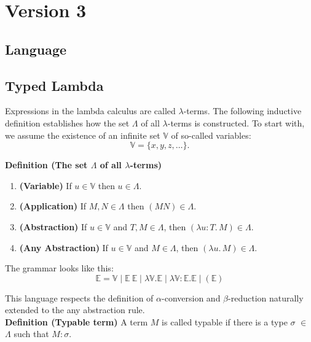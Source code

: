 \section{Version 3}

\subsection{Language}

\subsection{Typed Lambda}

Expressions in the lambda calculus are called \(\lambda\)-terms. The following inductive definition establishes how the set \(\Lambda\) of all \(\lambda\)-terms is constructed. To start with, we assume the existence of an infinite set \(\mathbb{V}\) of so-called variables:
\[
\mathbb{V} = \{ x, y, z, \dots \}.
\]

\medskip

\noindent\textbf{Definition (The set \(\Lambda\) of all \(\lambda\)-terms)}  
\begin{enumerate}
    \item \textbf{(Variable)} If \(u \in \mathbb{V}\) then \(u \in \Lambda\).
    \item \textbf{(Application)} If \(M, N \in \Lambda\) then \((MN) \in \Lambda\).
    \item \textbf{(Abstraction)} If \(u \in \mathbb{V}\) and \(T, M \in \Lambda\), then \((\lambda u : T .\, M) \in \Lambda\).
    \item \textbf{(Any Abstraction)} If \(u \in \mathbb{V}\) and \(M \in \Lambda\), then \((\lambda u .\, M) \in \Lambda\).
\end{enumerate}
\medskip

\noindent The grammar looks like this:
\[
\mathbb{E} = \mathbb{V} \mid \mathbb{E}\ \mathbb{E} \mid \lambda \mathbb{V}.\mathbb{E} \mid \lambda \mathbb{V}\colon\mathbb{E}.\mathbb{E} \mid (\mathbb{E})
\]

\noindent This language respects the definition of $\alpha$-conversion and $\beta$-reduction naturally extended to the any abstraction rule.\\

\noindent \textbf{Definition (Typable term)} \quad A term \( M \) is called typable if there is a type \(\sigma\) $\in$ $\Lambda$ such that $M : \sigma$.\\

